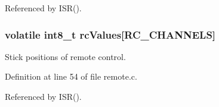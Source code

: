 Referenced by I\-S\-R().

\hypertarget{group__remote_gabcacf6e881a9c8d7e83e8bdf7f72dda5}{
\subsubsection[{rc\-Values}]{\setlength{\rightskip}{0pt plus 5cm}volatile int8\-\_\-t rc\-Values\mbox{[}{\bf R\-C\-\_\-\-C\-H\-A\-N\-N\-E\-L\-S}\mbox{]}}}\label{group__remote_gabcacf6e881a9c8d7e83e8bdf7f72dda5}


Stick positions of remote control. 



Definition at line 54 of file remote.\-c.



Referenced by I\-S\-R().

